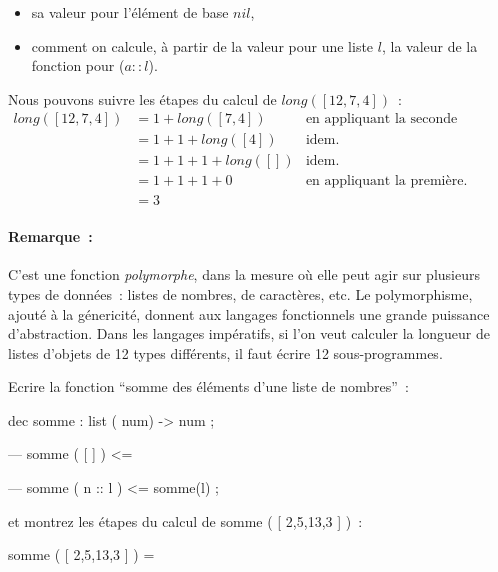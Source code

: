 \begin{itemize}
\item sa valeur pour l'élément de base $nil$,
\item comment on calcule, à partir de la valeur pour une liste $l$, la valeur de la fonction pour ($a::l$).
\end{itemize}

Nous pouvons suivre les étapes du calcul de $long( [ 12, 7, 4 ] )$~:
$$\begin{array}{rll}
long( [ 12, 7, 4 ] ) &= 1 + long( [7, 4 ] )&	\mbox{en appliquant la seconde équation} \\
			&= 1 + 1 + long( [ 4 ] )&\mbox{idem.}\\
			&= 1 + 1 + 1 + long ( [ ] )&\mbox{idem.}\\
			&= 1 + 1 + 1 + 0 &\mbox{en appliquant la première.} \\
			&= 3 &
\end{array}$$



\paragraph*{Remarque~:} C'est une fonction \emph{polymorphe}, 
dans la mesure o\`u elle peut agir sur plusieurs types de données~:
listes de nombres, de caractères, etc. Le polymorphisme, ajouté à la
génericité, donnent aux langages fonctionnels une grande puissance
d'abstraction. Dans les langages impératifs, si l'on veut calculer la
longueur de listes d'objets de 12 types différents, il faut écrire 12
sous-programmes.


\begin{exercice}
 Ecrire la fonction ``somme des éléments d'une liste de nombres''~:
\begin{verbatimtab}
dec somme : list ( num) -> num ;

--- somme ( [ ] )       <= 				

--- somme ( n :: l )    <=   somme(l)                    ;
\end{verbatimtab}
et montrez les étapes du calcul de somme ( [ 2,5,13,3 ] )~:
\begin{verbatimtab}
somme ( [ 2,5,13,3 ] ) 	=





\end{verbatimtab}
\end{exercice}






